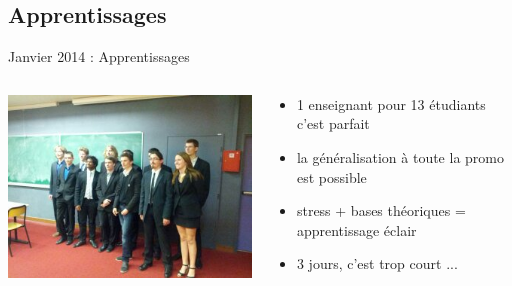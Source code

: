 \documentclass{beamer}
\begin{document}
\subsection{Apprentissages}
\begin{frame}{Janvier 2014 : Apprentissages}
  \begin{columns}
    \begin{column}{0.5\textwidth}
      \begin{center}
        \includegraphics[width=\textwidth]{includes/201401_soutenance.jpg}      
      \end{center}
    \end{column}
    \begin{column}{0.5\textwidth}
  \begin{itemize}
    \item 1 enseignant pour 13 étudiants c'est parfait
    \item la généralisation à toute la promo est possible
    \item stress + bases théoriques = apprentissage éclair
    \item 3 jours, c'est trop court ...
  \end{itemize}
    \end{column}
  \end{columns}
\end{frame}
\end{document}
